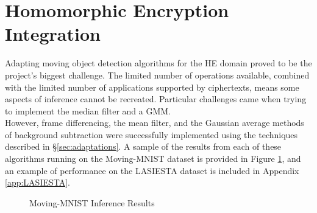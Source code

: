 \setlength{\leftskip}{0cm}




\section{Homomorphic Encryption Integration}
\label{sec:integration}
\setlength{\leftskip}{0.25cm}
\indent \indent
Adapting moving object detection algorithms for the HE domain proved to be the project's biggest challenge. The limited number of operations available, combined with the limited number of applications supported by ciphertexts, means some aspects of inference cannot be recreated. Particular challenges came when trying to implement the median filter and a GMM.
\smallskip \\ \indent
However, frame differencing, the mean filter, and the Gaussian average methods of background subtraction were successfully implemented using the techniques described in §\ref{sec:adaptations}. A sample of the results from each of these algorithms running on the Moving-MNIST dataset is provided in Figure \ref{fig:mnistInferenceResults}, and an example of performance on the LASIESTA dataset is included in Appendix \ref{app:LASIESTA}.
\begin{figure}
    \centering
    
    \caption{Moving-MNIST Inference Results}
    \label{fig:mnistInferenceResults}
\end{figure}
\setlength{\leftskip}{0cm}

